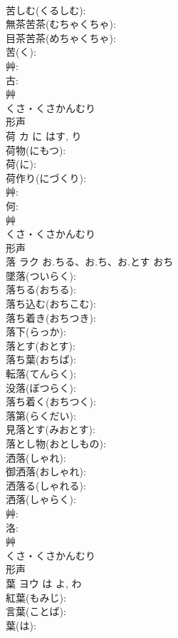 \documentclass[8pt]{extreport}
\begin{document}
\begin{CJK}{UTF8}{min}
\\	苦しむ(くるしむ): 
\\	無茶苦茶(むちゃくちゃ): 
\\	目茶苦茶(めちゃくちゃ): 
\\	苦(く): 
\\	艸: 
\\	古: 
\\	艸	
\\	くさ・くさかんむり	
\\	形声 
\\	荷	カ	に	はす, り	
\\	荷物(にもつ): 
\\	荷(に): 
\\	荷作り(にづくり): 
\\	艸: 
\\	何: 
\\	艸	
\\	くさ・くさかんむり	
\\	形声 
\\	落	ラク	お.ちる、お.ち、お.とす	おち	
\\	墜落(ついらく): 
\\	落ちる(おちる): 
\\	落ち込む(おちこむ): 
\\	落ち着き(おちつき): 
\\	落下(らっか): 
\\	落とす(おとす): 
\\	落ち葉(おちば): 
\\	転落(てんらく): 
\\	没落(ぼつらく): 
\\	落ち着く(おちつく): 
\\	落第(らくだい): 
\\	見落とす(みおとす): 
\\	落とし物(おとしもの): 
\\	洒落(しゃれ): 
\\	御洒落(おしゃれ): 
\\	洒落る(しゃれる): 
\\	洒落(しゃらく): 
\\	艸: 
\\	洛: 
\\	艸	
\\	くさ・くさかんむり	
\\	形声 
\\	葉	ヨウ	は	よ, わ	
\\	紅葉(もみじ): 
\\	言葉(ことば): 
\\	葉(は): 

\end{CJK}
\end{document}
